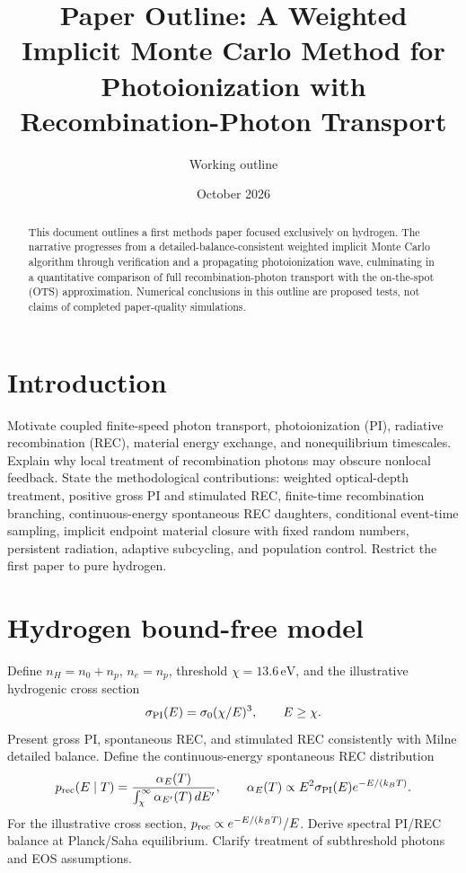\documentclass[11pt]{article}
\title{Paper Outline: A Weighted Implicit Monte Carlo Method for Photoionization with Recombination-Photon Transport}
\author{Working outline}
\date{October 2026}
\begin{document}
\maketitle
\begin{abstract}
This document outlines a first methods paper focused exclusively on hydrogen. The narrative progresses from a detailed-balance-consistent weighted implicit Monte Carlo algorithm through verification and a propagating photoionization wave, culminating in a quantitative comparison of full recombination-photon transport with the on-the-spot (OTS) approximation. Numerical conclusions in this outline are proposed tests, not claims of completed paper-quality simulations.
\end{abstract}
\section{Introduction}
Motivate coupled finite-speed photon transport, photoionization (PI), radiative recombination (REC), material energy exchange, and nonequilibrium timescales. Explain why local treatment of recombination photons may obscure nonlocal feedback. State the methodological contributions: weighted optical-depth treatment, positive gross PI and stimulated REC, finite-time recombination branching, continuous-energy spontaneous REC daughters, conditional event-time sampling, implicit endpoint material closure with fixed random numbers, persistent radiation, adaptive subcycling, and population control. Restrict the first paper to pure hydrogen.
\section{Hydrogen bound-free model}
Define $n_H=n_0+n_p$, $n_e=n_p$, threshold $\chi=13.6\,\mathrm{eV}$, and the illustrative hydrogenic cross section
\begin{equation}
\sigma_{\rm PI}(E)=\sigma_0(\chi/E)^3,\qquad E\ge\chi.
\end{equation}
Present gross PI, spontaneous REC, and stimulated REC consistently with Milne detailed balance. Define the continuous-energy spontaneous REC distribution
\begin{equation}
p_{\rm rec}(E\mid T)=\frac{\alpha_E(T)}{\int_\chi^\infty\alpha_{E'}(T)\,dE'},\qquad
\alpha_E(T)\propto E^2\sigma_{\rm PI}(E)e^{-E/(k_BT)}.
\end{equation}
For the illustrative cross section, $p_{\rm rec}\propto e^{-E/(k_BT)}/E$. Derive spectral PI/REC balance at Planck/Saha equilibrium. Clarify treatment of subthreshold photons and EOS assumptions.
\end{document}

